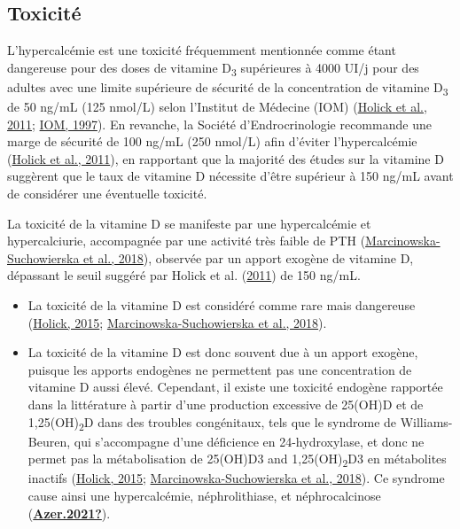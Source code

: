 \documentclass[
  letterpaper,
  DIV=11,
  numbers=noendperiod]{scrartcl}
\begin{document}
\hypertarget{toxicituxe9}{%
\subsection{Toxicité}\label{toxicituxe9}}

L'hypercalcémie est une toxicité fréquemment mentionnée comme étant
dangereuse pour des doses de vitamine D\textsubscript{3} supérieures à
4000 UI/j pour des adultes avec une limite supérieure de sécurité de la
concentration de vitamine D\textsubscript{3} de 50 ng/mL (125 nmol/L)
selon l'Institut de Médecine (IOM)
(\protect\hyperlink{ref-Holick.2011}{Holick et al., 2011};
\protect\hyperlink{ref-IOM.1997}{IOM, 1997}). En revanche, la Société
d'Endrocrinologie recommande une marge de sécurité de 100 ng/mL (250
nmol/L) afin d'éviter l'hypercalcémie
(\protect\hyperlink{ref-Holick.2011}{Holick et al., 2011}), en
rapportant que la majorité des études sur la vitamine D suggèrent que le
taux de vitamine D nécessite d'être supérieur à 150 ng/mL avant de
considérer une éventuelle toxicité.

La toxicité de la vitamine D se manifeste par une hypercalcémie et
hypercalciurie, accompagnée par une activité très faible de PTH
(\protect\hyperlink{ref-Marcinowska-Suchowierska.2018}{Marcinowska-Suchowierska
et al., 2018}), observée par un apport exogène de vitamine D, dépassant
le seuil suggéré par Holick et al.
(\protect\hyperlink{ref-Holick.2011}{2011}) de 150 ng/mL.

\begin{itemize}
\item
  La toxicité de la vitamine D est considéré comme rare mais dangereuse
  (\protect\hyperlink{ref-Holick.2015}{Holick, 2015};
  \protect\hyperlink{ref-Marcinowska-Suchowierska.2018}{Marcinowska-Suchowierska
  et al., 2018}).
\item
  La toxicité de la vitamine D est donc souvent due à un apport exogène,
  puisque les apports endogènes ne permettent pas une concentration de
  vitamine D aussi élevé. Cependant, il existe une toxicité endogène
  rapportée dans la littérature à partir d'une production excessive de
  25(OH)D et de 1,25(OH)\textsubscript{2}D dans des troubles
  congénitaux, tels que le syndrome de Williams-Beuren, qui s'accompagne
  d'une déficience en 24-hydroxylase, et donc ne permet pas la
  métabolisation de 25(OH)D3 and 1,25(OH)\textsubscript{2}D3 en
  métabolites inactifs (\protect\hyperlink{ref-Holick.2015}{Holick,
  2015};
  \protect\hyperlink{ref-Marcinowska-Suchowierska.2018}{Marcinowska-Suchowierska
  et al., 2018}). Ce syndrome cause ainsi une hypercalcémie,
  néphrolithiase, et néphrocalcinose
  (\protect\hyperlink{ref-Azer.2021}{\textbf{Azer.2021?}}).
\end{itemize}
\end{document}
